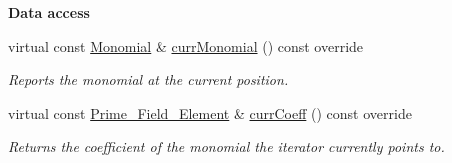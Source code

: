 \begin{Indent}\textbf{ Data access}\par
\begin{DoxyCompactItemize}
\item 
\mbox{\label{group___iterator_group_a0a8c14daf501f3ab4a6f708aabf21f08}} 
virtual const \hyperlink{group__polygroup_class_monomial}{Monomial} \& \hyperlink{group___iterator_group_a0a8c14daf501f3ab4a6f708aabf21f08}{curr\+Monomial} () const override
\begin{DoxyCompactList}\small\item\em Reports the monomial at the current position. \end{DoxyCompactList}\item 
\mbox{\label{group___iterator_group_a1ae954211a895e0a73ffd51e569161dc}} 
virtual const \hyperlink{group___fields_group_class_prime___field___element}{Prime\+\_\+\+Field\+\_\+\+Element} \& \hyperlink{group___iterator_group_a1ae954211a895e0a73ffd51e569161dc}{curr\+Coeff} () const override
\begin{DoxyCompactList}\small\item\em Returns the coefficient of the monomial the iterator currently points to. \end{DoxyCompactList}\end{DoxyCompactItemize}
\end{Indent}
